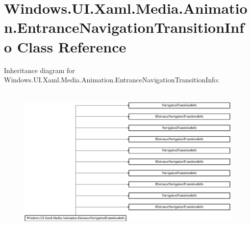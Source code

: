 \hypertarget{class_windows_1_1_u_i_1_1_xaml_1_1_media_1_1_animation_1_1_entrance_navigation_transition_info}{}\section{Windows.\+U\+I.\+Xaml.\+Media.\+Animation.\+Entrance\+Navigation\+Transition\+Info Class Reference}
\label{class_windows_1_1_u_i_1_1_xaml_1_1_media_1_1_animation_1_1_entrance_navigation_transition_info}
Inheritance diagram for Windows.\+U\+I.\+Xaml.\+Media.\+Animation.\+Entrance\+Navigation\+Transition\+Info\+:\begin{figure}[H]
\begin{center}
\leavevmode
\includegraphics[height=7.586207cm]{class_windows_1_1_u_i_1_1_xaml_1_1_media_1_1_animation_1_1_entrance_navigation_transition_info}
\end{center}
\end{figure}
